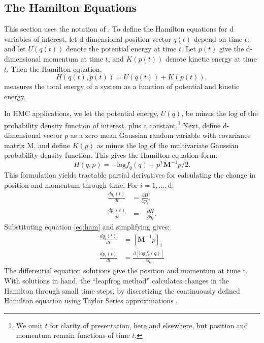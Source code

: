 \subsection{The Hamilton Equations} %

This section uses the notation of \cite{Neal2011}. To define the Hamilton equations for d variables of interest, let d-dimensional position vector $q(t)$ depend on time $t$; and let $U(q(t))$ denote the potential energy at time $t$. Let $p(t)$ give the d-dimensional momentum at time $t$, and $K(p(t))$ denote kinetic energy at time $t$. Then the Hamilton equation,
\begin{equation}
H(q(t),p(t)) = U(q(t)) + K(p(t)),
\end{equation}
measures the total energy of a system as a function of potential and kinetic energy. 

In HMC applications, we let the potential energy, $U(q)$, be minus the log of the probability density function of interest, plus a constant.\footnote{We omit $t$ for clarity of presentation, here and elsewhere, but position and momentum remain functions of time $t$.} Next, define d-dimensional vector $p$ as a zero mean Gaussian random variable with covariance matrix M, and define $K(p)$ as minus the log of the multivariate Gaussian probability density function. This gives the Hamilton equation form:
\begin{equation} \label{eq:ham}
H(q,p) = -\text{log}f_{q}(q) + p^{T}\pmb{M}^{-1}p/2.
\end{equation}
This formulation yields tractable partial derivatives for calculating the change in position and momentum through time. For $i = 1,\dots, \text{d}$:
\begin{align}
\frac{d q_{i}(t)}{dt} &= \frac{\partial H}{\partial p_{i}}, \\
\frac{d p_{i}(t)}{dt} &= -\frac{\partial H}{\partial q_{i}}.
\end{align}
Substituting equation \ref{eq:ham} and simplifying gives:
\begin{align}
\frac{d q_{i}(t)}{dt} &=  [\pmb{M}^{-1}p]_{i} \\
\frac{d p_{i}(t)}{dt} &= \frac {\partial \left[ \text{log}f_{q}(q) \right]}{\partial q_{i}}
\end{align}
The differential equation solutions give the position and momentum at time t. With solutions in hand, the ``leapfrog method'' calculates changes in the Hamilton through small time steps, by discretizing the continuously defined Hamilton equation using Taylor Series approximations \citep{Neal2011}. 

